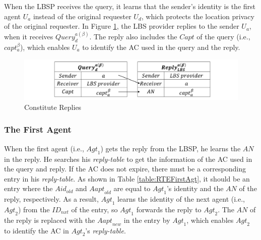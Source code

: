 \noindent When the LBSP receives the query, it learns that the sender's identity is the first agent $U_a$ instead of the original requester $U_d$, which protects the location privacy of the original requester. In Figure \ref{fig:ConstituteReplies}, the LBS provider replies to the sender $U_a$, when it receives ${Query}^{a\left(\beta\right)}_d$. The reply also includes the $Capt$ of the query (i.e., $capt_a^\beta$), which enables $U_a$ to identify the AC used in the query and the reply.

\begin{figure} [H]
\centering 
\includegraphics[width=6.0in]{figures/FIG_4_6_Constitute_Replies.png}
\caption{Constitute Replies} 
\label{fig:ConstituteReplies} %
\end{figure}

\subsubsection{The First Agent}

\noindent When the first agent (i.e., ${Agt}_1$) gets the reply from the LBSP, he learns the $AN$ in the reply. He searches his \textit{reply-table} to get the information of the AC used in the query and reply. If the AC does not expire, there must be a corresponding entry in his \textit{reply-table}. As shown in Table \ref{table:RTEFirstAgt}, it should be an entry where the $Aid_{old}$ and ${Aapt}_{old}$ are equal to ${Agt}_1$'s identity and the $AN$ of the reply, respectively. As a result, ${Agt}_1$ learns the identity of the next agent (i.e., ${Agt}_2$) from the ${ID}_{nxt}$ of the entry, so ${Agt}_1$ forwards the reply to ${Agt}_2$. The $AN$ of the reply is replaced with the ${Aapt}_{new}$ in the entry by ${Agt}_1$, which enables ${Agt}_2$ to identify the AC in ${Agt}_2$'s \textit{reply-table}.

